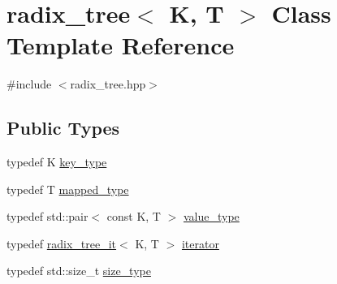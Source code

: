 \hypertarget{classradix__tree}{}\section{radix\+\_\+tree$<$ K, T $>$ Class Template Reference}
\label{classradix__tree}


{\ttfamily \#include $<$radix\+\_\+tree.\+hpp$>$}

\subsection*{Public Types}
\begin{DoxyCompactItemize}
\item 
typedef K \hyperlink{classradix__tree_a9c91791a795ceee58a0c691a46956e8a}{key\+\_\+type}
\item 
typedef T \hyperlink{classradix__tree_a08a4d9146274d8f166604a9ba670227d}{mapped\+\_\+type}
\item 
typedef std\+::pair$<$ const K, T $>$ \hyperlink{classradix__tree_a6053e1b2ccac54f990d6377a1797ebc8}{value\+\_\+type}
\item 
typedef \hyperlink{classradix__tree__it}{radix\+\_\+tree\+\_\+it}$<$ K, T $>$ \hyperlink{classradix__tree_a820fe40af6049993760c529e918c5575}{iterator}
\item 
typedef std\+::size\+\_\+t \hyperlink{classradix__tree_a67d23e7c48875261141f6259ade40749}{size\+\_\+type}
\end{DoxyCompactItemize}
